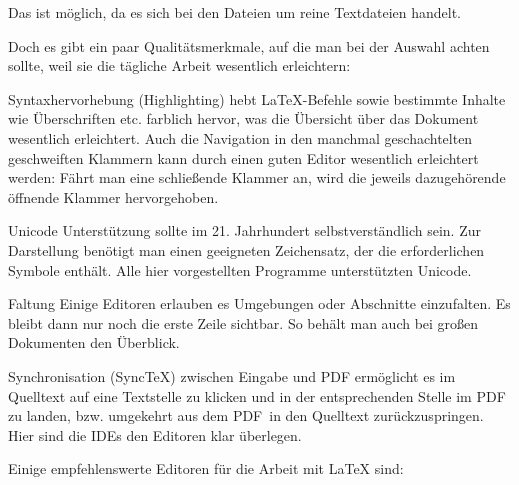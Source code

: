 
Das ist möglich, da es sich bei den Dateien um reine Textdateien handelt.

Doch es gibt ein paar Qualitätsmerkmale, auf die man bei der Auswahl achten sollte, weil
sie die tägliche Arbeit wesentlich erleichtern:

\begin{labeling}{}

\item[Syntaxhervorhebung] (Highlighting) hebt \LaTeX-Befehle sowie bestimmte
  Inhalte wie Überschriften etc. farblich hervor, was die Übersicht über das
  Dokument wesentlich erleichtert. Auch die Navigation in den manchmal
  geschachtelten geschweiften Klammern kann durch einen guten Editor
  wesentlich erleichtert werden: Fährt man eine schließende Klammer an, wird
  die jeweils dazugehörende öffnende Klammer hervorgehoben.

\item [Unicode Unterstützung] sollte im 21. Jahrhundert selbstverständlich
  sein.  Zur Darstellung benötigt man einen geeigneten Zeichensatz, der die
  erforderlichen Symbole enthält. Alle hier vorgestellten Programme
  unterstützten Unicode.

\item [Faltung] Einige Editoren erlauben es Umgebungen oder Abschnitte
  einzufalten.  Es bleibt dann nur noch die erste Zeile sichtbar. So behält
  man auch bei großen Dokumenten den Überblick.

\item [Synchronisation] (SyncTeX) zwischen Eingabe und PDF ermöglicht es im
  Quelltext auf eine Textstelle zu klicken und in der entsprechenden Stelle
  im PDF zu landen, bzw.  umgekehrt aus dem PDF in den Quelltext
  zurückzuspringen. Hier sind die IDEs den Editoren klar überlegen.

\end{labeling}

Einige empfehlenswerte Editoren für die Arbeit mit \LaTeX{} sind:

